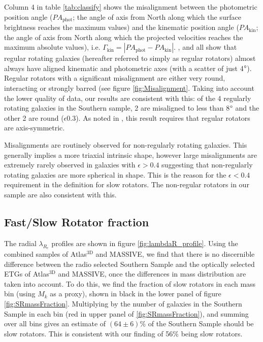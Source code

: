 		Column 4 in table \ref{tab:classify} shows the misalignment between the photometric position angle ($PA_\text{phot}$; the angle of axis from North along which the surface brightness reaches the maximum values) and the kinematic position angle ($PA_\text{kin}$; the angle of axis from North along which the projected velocities reaches the maximum absolute values), i.e. $\Gamma_\text{kin} = \left| PA_\text{phot} - PA_\text{kin} \right|$. \citet{Cappellari2007}, \citet{Krajnovic2011} and \citet{Fogarty2015} all show that regular rotating galaxies (hereafter referred to simply as regular rotators) almost always have aligned kinematic and photometric axes (with a scatter of just 4$\degree$). Regular rotators with a significant misalignment are either very round, interacting or strongly barred (see figure \ref{fig:Misalignment}. Taking into account the lower quality of data, our results are consistent with this: of the 4 regularly rotating galaxies in the Southern sample, 2 are misaligned to less than 8$\degree$ and the other 2 are round ($\epsilon  0.3$). As noted in \citet{Cappellari2016}, this result requires that regular rotators are axis-symmetric.

		Misalignments are routinely observed for non-regularly rotating galaxies. This generally implies a more triaxial intrinsic shape, however large misalignments are extremely rarely observed in galaxies with $\epsilon > 0.4$ suggesting that non-regularly rotating galaxies are more spherical in shape. This is the reason for the $\epsilon < 0.4$ requirement in the definition for slow rotators. The non-regular rotators in our sample are also consistent with this.


	\subsection{Fast/Slow Rotator fraction}
		\label{subsec:FSfrac}
		The radial $\lambda_{R_e}$ profiles are shown in figure \ref{fig:lambdaR_profile}. Using the combined samples of Atlas$^\text{3D}$ and MASSIVE, we find that there is no discernible difference between the radio selected Southern Sample and the optically selected ETGs of Atlas$^\text{3D}$ and MASSIVE, once the differences in mass distribution are taken into account. To do this, we find the fraction of slow rotators in each mass bin (using $M_k$ as a proxy), shown in black in the lower panel of figure \ref{fig:SRmassFraction}. Multiplying by the number of galaxies in the Southern Sample in each bin (red in upper panel of \ref{fig:SRmassFraction}), and summing over all bins gives an estimate of $(64 \pm 6)\%$ of the Southern Sample should be slow rotators. This is consistent with our finding of 56\% being slow rotators.

